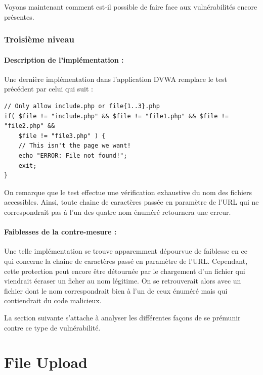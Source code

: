 Voyons maintenant comment est-il possible de faire face aux vulnérabilités encore présentes.

\subsubsection{Troisième niveau}

\paragraph{Description de l'implémentation :}

Une dernière implémentation dans l'application DVWA remplace le test précédent par celui qui suit :

\begin{lstlisting}
// Only allow include.php or file{1..3}.php
if( $file != "include.php" && $file != "file1.php" && $file != "file2.php" && 
    $file != "file3.php" ) {
    // This isn't the page we want!
    echo "ERROR: File not found!";
    exit;
}
\end{lstlisting}

On remarque que le test effectue une vérification exhaustive du nom des fichiers accessibles. Ainsi, toute chaine de caractères passée en paramètre de l'URL qui ne correspondrait pas à l'un des quatre nom énuméré retournera une erreur.

\paragraph{Faiblesses de la contre-mesure :}

Une telle implémentation se trouve apparemment dépourvue de faiblesse en ce qui concerne la chaine de caractères passé en paramètre de l'URL. Cependant, cette protection peut encore être détournée par le chargement d'un fichier qui viendrait écraser un ficher au nom légitime. On se retrouverait alors avec un fichier dont le nom correspondrait bien à l'un de ceux énuméré mais qui contiendrait du code malicieux. 

La section suivante s'attache à analyser les différentes façons de se prémunir contre ce type de vulnérabilité.

\clearpage

\newpage

\section{File Upload}
\label{fu}

